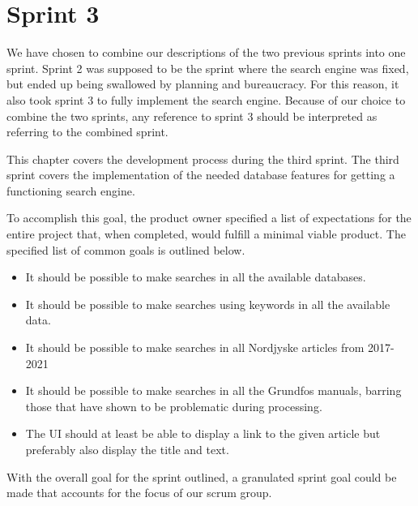 \chapter{Sprint 3}
We have chosen to combine our descriptions of the two previous sprints into one sprint. Sprint 2 was supposed to be the sprint where the search engine was fixed, but ended up being swallowed by planning and bureaucracy. For this reason, it also took sprint 3 to fully implement the search engine. Because of our choice to combine the two sprints, any reference to sprint 3 should be interpreted as referring to the combined sprint.


This chapter covers the development process during the third sprint. The third sprint covers the implementation of the needed database features for getting a functioning search engine. 


To accomplish this goal, the product owner specified a list of expectations for the entire \knox{} project that, when completed, would fulfill a minimal viable product. The specified list of common goals is outlined below.
\begin{itemize}
	\item It should be possible to make searches in all the available databases.
	\item It should be possible to make searches using keywords in all the available data.
	\item It should be possible to make searches in all Nordjyske articles from 2017-2021
	\item It should be possible to make searches in all the Grundfos manuals, barring those that have shown to be problematic during processing.
	\item The UI should at least be able to display a link to the given article but preferably also display the title and text.
\end{itemize}

With the overall goal for the sprint outlined, a granulated sprint goal could be made that accounts for the focus of our scrum group.





